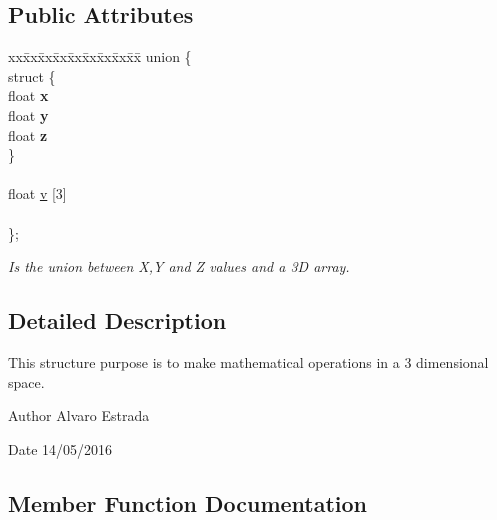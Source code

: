 \subsection*{Public Attributes}
\begin{DoxyCompactItemize}
\item 
\begin{tabbing}
xx\=xx\=xx\=xx\=xx\=xx\=xx\=xx\=xx\=\kill
union \{\\
\>struct \{\\
\>\>float {\bfseries x}\\
\>\>float {\bfseries y}\\
\>\>float {\bfseries z}\\
\>\} \hypertarget{unionae_core_1_1ae_vector3_1_1_0D26_a5594fa73c969c7c0dfbf56a710bf6c5b}{}\label{unionae_core_1_1ae_vector3_1_1_0D26_a5594fa73c969c7c0dfbf56a710bf6c5b}
\\
\>\>\\
\>float \hyperlink{structae_core_1_1ae_vector3_a273e068da49c1c595bbe877db36ce51c}{v} \mbox{[}3\mbox{]}\\
\>\>\\
\}; \hypertarget{structae_core_1_1ae_vector3_a93f89b631e2f1dc82c718693d315f110}{}\label{structae_core_1_1ae_vector3_a93f89b631e2f1dc82c718693d315f110}
\\

\end{tabbing}\begin{DoxyCompactList}\small\item\em Is the union between X,Y and Z values and a 3D array. \end{DoxyCompactList}\end{DoxyCompactItemize}


\subsection{Detailed Description}
This structure purpose is to make mathematical operations in a 3 dimensional space. 

\begin{DoxyAuthor}{Author}
Alvaro Estrada 
\end{DoxyAuthor}
\begin{DoxyDate}{Date}
14/05/2016 
\end{DoxyDate}


\subsection{Member Function Documentation}
